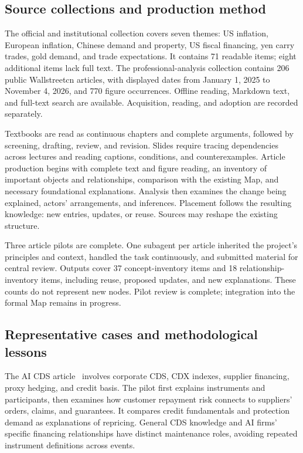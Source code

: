 \documentclass[11pt,letterpaper]{article}
\begin{document}
\subsection{Source collections and production method}

The official and institutional collection covers seven themes: US inflation, European inflation, Chinese demand and property, US fiscal financing, yen carry trades, gold demand, and trade expectations. It contains 71 readable items; eight additional items lack full text. The professional-analysis collection contains 206 public Wallstreetcn articles, with displayed dates from January 1, 2025 to November 4, 2026, and 770 figure occurrences. Offline reading, Markdown text, and full-text search are available. Acquisition, reading, and adoption are recorded separately.

Textbooks are read as continuous chapters and complete arguments, followed by screening, drafting, review, and revision. Slides require tracing dependencies across lectures and reading captions, conditions, and counterexamples. Article production begins with complete text and figure reading, an inventory of important objects and relationships, comparison with the existing Map, and necessary foundational explanations. Analysis then examines the change being explained, actors' arrangements, and inferences. Placement follows the resulting knowledge: new entries, updates, or reuse. Sources may reshape the existing structure.

Three article pilots are complete. One subagent per article inherited the project's principles and context, handled the task continuously, and submitted material for central review. Outputs cover 37 concept-inventory items and 18 relationship-inventory items, including reuse, proposed updates, and new explanations. These counts do not represent new nodes. Pilot review is complete; integration into the formal Map remains in progress.

\subsection{Representative cases and methodological lessons}

The AI CDS article~\cite{aicds} involves corporate CDS, CDX indexes, supplier financing, proxy hedging, and credit basis. The pilot first explains instruments and participants, then examines how customer repayment risk connects to suppliers' orders, claims, and guarantees. It compares credit fundamentals and protection demand as explanations of repricing. General CDS knowledge and AI firms' specific financing relationships have distinct maintenance roles, avoiding repeated instrument definitions across events.
\end{document}
